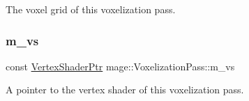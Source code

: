 The voxel grid of this voxelization pass. \hypertarget{classmage_1_1_voxelization_pass_a228d6cbcd1ed2948ffba87b2461beca6}{}\label{classmage_1_1_voxelization_pass_a228d6cbcd1ed2948ffba87b2461beca6} 
\subsubsection{\texorpdfstring{m\+\_\+vs}{m\_vs}}
{\footnotesize\ttfamily const \hyperlink{namespacemage_a1f19b094f771e30bc0a6c1cebcc0dd58}{Vertex\+Shader\+Ptr} mage\+::\+Voxelization\+Pass\+::m\+\_\+vs\hspace{0.3cm}{\ttfamily [private]}}

A pointer to the vertex shader of this voxelization pass. 